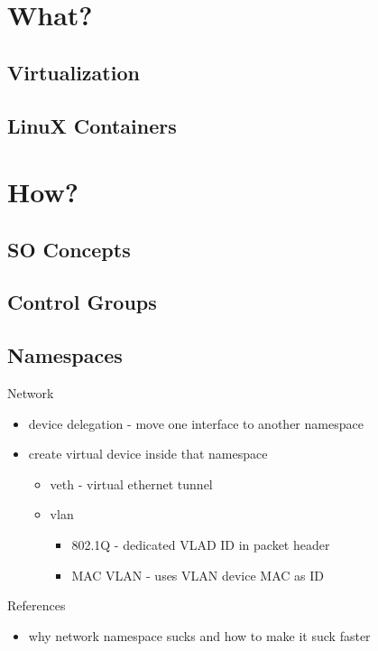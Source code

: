\documentclass{beamer}
\begin{document}
\section{What?}

\subsection{Virtualization}

\subsection{LinuX Containers}

\section{How?}

\subsection{SO Concepts}

\subsection{Control Groups}

\subsection{Namespaces}

\begin{frame}{Network}
\begin{itemize}
\item device delegation - move one interface to another namespace
\item create virtual device inside that namespace
\begin{itemize}
\item veth - virtual ethernet tunnel
\item vlan
\begin{itemize}
\item 802.1Q - dedicated VLAD ID in packet header
\item MAC VLAN - uses VLAN device MAC as ID
\end{itemize}
\end{itemize}
\end{itemize}
\end{frame}

\begin{frame}{References}
\begin{itemize}
\item why network namespace sucks and how to make it suck faster
\end{itemize}
\end{frame}
\end{document}

